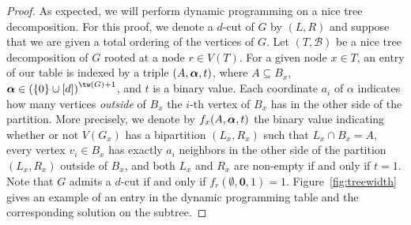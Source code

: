 \begin{proof}
    As expected, we will perform dynamic programming on a nice tree decomposition.
    For this proof, we denote a $d$-cut of $G$ by $(L, R)$ and suppose that we are given a total ordering of the vertices of $G$.
    Let $(T, \mathcal{B})$ be a nice tree decomposition of $G$ rooted at a node $r \in V(T)$.
    For a given node $x \in T$, an entry of our table is indexed by a triple $(A, \boldsymbol{\alpha}, t)$, where $A \subseteq B_x$, $\balpha \in \left(\{0\} \cup [d]\right)^{\tw(G)+1}$, and $t$ is a binary value. Each coordinate $a_i$ of $\alpha$ indicates how many vertices {\sl outside} of $B_x$ the $i$-th vertex of $B_x$ has in the other side of the partition. More precisely, we denote by $f_x(A, \boldsymbol{\alpha}, t)$ the binary value indicating whether or not $V(G_x)$ has a bipartition $(L_x,R_x)$ such that $L_x \cap B_x = A$, every vertex $v_i \in B_x$ has exactly $a_i$ neighbors in the other side of the partition $(L_x,R_x)$  outside of $B_x$, and both $L_x$ and $R_x$ are non-empty if and only if $t = 1$. Note that $G$ admits a $d$-cut if and only if $f_r(\emptyset, \boldsymbol{0}, 1)=1$.
    Figure~\ref{fig:treewidth} gives an example of an entry in the dynamic programming table and the corresponding solution on the subtree.





\end{proof}
